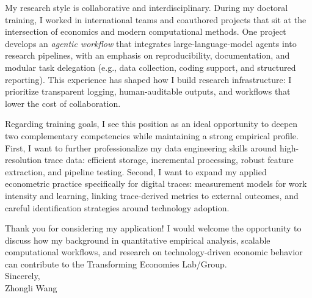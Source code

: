 \documentclass[11pt]{article}
\begin{document}
My research style is collaborative and interdisciplinary. During my doctoral training, I worked in international teams and coauthored projects that sit at the intersection of economics and modern computational methods. One project develops an \emph{agentic workflow} that integrates large-language-model agents into research pipelines, with an emphasis on reproducibility, documentation, and modular task delegation (e.g., data collection, coding support, and structured reporting). This experience has shaped how I build research infrastructure: I prioritize transparent logging, human-auditable outputs, and workflows that lower the cost of collaboration. 

Regarding training goals, I see this position as an ideal opportunity to deepen two complementary competencies while maintaining a strong empirical profile. First, I want to further professionalize my data engineering skills around high-resolution trace data: efficient storage, incremental processing, robust feature extraction, and pipeline testing. Second, I want to expand my applied econometric practice specifically for digital traces: measurement models for work intensity and learning, linking trace-derived metrics to external outcomes, and careful identification strategies around technology adoption. 


Thank you for considering my application! I would welcome the opportunity to discuss how my background in quantitative empirical analysis, scalable computational workflows, and research on technology-driven economic behavior can contribute to the Transforming Economies Lab/Group.\\[0.35cm]

\noindent Sincerely,\\[0.9cm]
\noindent Zhongli Wang
\end{document}
